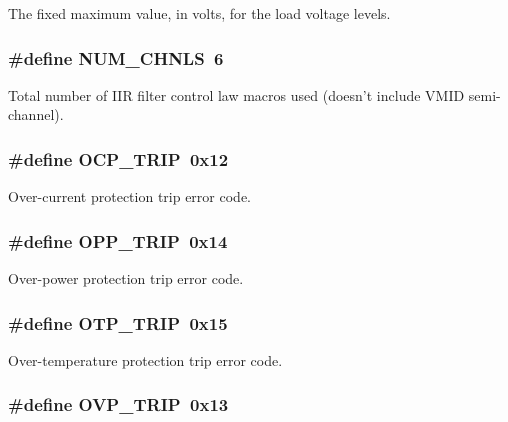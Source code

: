 The fixed maximum value, in volts, for the load voltage levels. \hypertarget{a00043_afe433b138bb71d8d26b6e0907e656d1b}{
\subsubsection[{N\-U\-M\-\_\-\-C\-H\-N\-L\-S}]{\setlength{\rightskip}{0pt plus 5cm}\#define N\-U\-M\-\_\-\-C\-H\-N\-L\-S~6}}\label{a00043_afe433b138bb71d8d26b6e0907e656d1b}
Total number of I\-I\-R filter control law macros used (doesn't include V\-M\-I\-D semi-\/channel). \hypertarget{a00043_a42d97deed6614a0b5b0aee655055b43a}{
\subsubsection[{O\-C\-P\-\_\-\-T\-R\-I\-P}]{\setlength{\rightskip}{0pt plus 5cm}\#define O\-C\-P\-\_\-\-T\-R\-I\-P~0x12}}\label{a00043_a42d97deed6614a0b5b0aee655055b43a}
Over-\/current protection trip error code. \hypertarget{a00043_a7037d8fd93cf1a2ae591b639614c0338}{
\subsubsection[{O\-P\-P\-\_\-\-T\-R\-I\-P}]{\setlength{\rightskip}{0pt plus 5cm}\#define O\-P\-P\-\_\-\-T\-R\-I\-P~0x14}}\label{a00043_a7037d8fd93cf1a2ae591b639614c0338}
Over-\/power protection trip error code. \hypertarget{a00043_a5815c03ac63c324e326a148e247f24a1}{
\subsubsection[{O\-T\-P\-\_\-\-T\-R\-I\-P}]{\setlength{\rightskip}{0pt plus 5cm}\#define O\-T\-P\-\_\-\-T\-R\-I\-P~0x15}}\label{a00043_a5815c03ac63c324e326a148e247f24a1}
Over-\/temperature protection trip error code. \hypertarget{a00043_ac330c784fd08c389f8649ac8e34d29e8}{
\subsubsection[{O\-V\-P\-\_\-\-T\-R\-I\-P}]{\setlength{\rightskip}{0pt plus 5cm}\#define O\-V\-P\-\_\-\-T\-R\-I\-P~0x13}}\label{a00043_ac330c784fd08c389f8649ac8e34d29e8}
